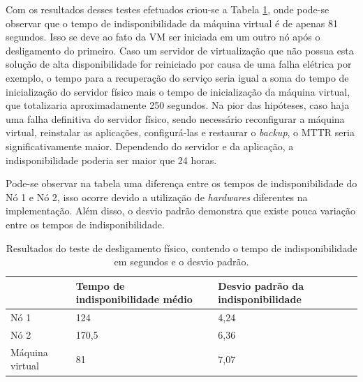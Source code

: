 Com os resultados desses testes efetuados criou-se a Tabela \ref{tab:teste1resultados}, onde pode-se observar que o tempo de indisponibilidade 
da máquina virtual é de apenas 81 segundos. Isso se deve ao fato da \ac{VM} ser iniciada em um outro nó após o desligamento do primeiro. 
Caso um servidor de virtualização que não possua esta solução de alta disponibilidade for reiniciado por causa de uma falha elétrica por exemplo,
o tempo para a recuperação do serviço seria igual a soma do tempo de inicialização do servidor físico mais o tempo de inicialização da máquina 
virtual, que totalizaria aproximadamente 250 segundos. 
Na pior das hipóteses, caso haja uma falha definitiva do servidor físico, sendo necessário reconfigurar a máquina virtual, reinstalar as aplicações,
configurá-las e restaurar o \textit{backup}, o \ac{MTTR} seria significativamente maior. Dependendo do servidor e da aplicação, 
a indisponibilidade poderia ser maior que 24 horas.

Pode-se observar na tabela uma diferença entre os tempos de indisponibilidade do Nó 1 e Nó 2, isso ocorre devido a utilização de \textit{hardwares}
diferentes na implementação. Além disso, o desvio padrão demonstra que existe pouca variação entre os tempos de indisponibilidade.



\begin{table}[h!]
\caption{Resultados do teste de desligamento físico, contendo o tempo de indisponibilidade em segundos e o desvio padrão.}
\label{tab:teste1resultados}
\begin{center}
\begin{tabular}{|l|l|l|}\hline
 & \textbf{Tempo de indisponibilidade médio} & \textbf{Desvio padrão da indisponibilidade} \\\hline
Nó 1 & 124 & 4,24 \\\hline
Nó 2 & 170,5 & 6,36 \\\hline
Máquina virtual & 81 & 7,07 \\\hline
\end{tabular}
\end{center}
\end{table}


